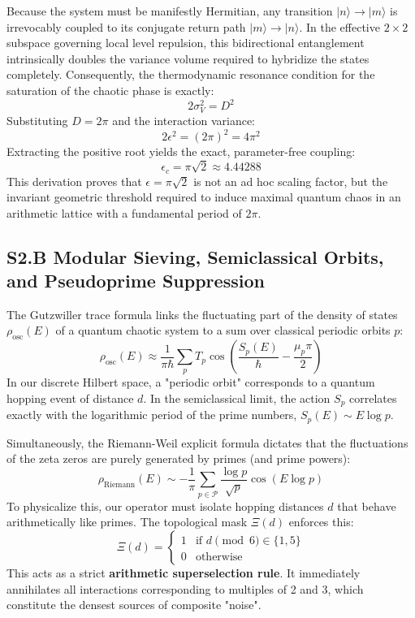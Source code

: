 \documentclass[aps,prl,preprint,superscriptaddress,floatfix]{revtex4-2}
\begin{document}
Because the system must be manifestly Hermitian, any transition $|n\rangle \to |m\rangle$ is irrevocably coupled to its conjugate return path $|m\rangle \to |n\rangle$. In the effective $2 \times 2$ subspace governing local level repulsion, this bidirectional entanglement intrinsically doubles the variance volume required to hybridize the states completely. Consequently, the thermodynamic resonance condition for the saturation of the chaotic phase is exactly:
\begin{equation}
2 \sigma_V^2 = D^2
\end{equation}
Substituting $D = 2\pi$ and the interaction variance:
\begin{equation}
2 \epsilon^2 = (2\pi)^2 = 4\pi^2
\end{equation}
Extracting the positive root yields the exact, parameter-free coupling:
\begin{equation}
\epsilon_c = \pi\sqrt{2} \approx 4.44288
\end{equation}
This derivation proves that $\epsilon = \pi\sqrt{2}$ is not an ad hoc scaling factor, but the invariant geometric threshold required to induce maximal quantum chaos in an arithmetic lattice with a fundamental period of $2\pi$.

\subsection{S2.B Modular Sieving, Semiclassical Orbits, and Pseudoprime Suppression}

The Gutzwiller trace formula links the fluctuating part of the density of states $\rho_{\text{osc}}(E)$ of a quantum chaotic system to a sum over classical periodic orbits $p$:
\begin{equation}
\rho_{\text{osc}}(E) \approx \frac{1}{\pi \hbar} \sum_p T_p \cos\left( \frac{S_p(E)}{\hbar} - \frac{\mu_p \pi}{2} \right)
\end{equation}
In our discrete Hilbert space, a "periodic orbit" corresponds to a quantum hopping event of distance $d$. In the semiclassical limit, the action $S_p$ correlates exactly with the logarithmic period of the prime numbers, $S_p(E) \sim E \log p$.

Simultaneously, the Riemann-Weil explicit formula dictates that the fluctuations of the zeta zeros are purely generated by primes (and prime powers):
\begin{equation}
\rho_{\text{Riemann}}(E) \sim -\frac{1}{\pi} \sum_{p \in \mathcal{P}} \frac{\log p}{\sqrt{p}} \cos(E \log p)
\end{equation}
To physicalize this, our operator must isolate hopping distances $d$ that behave arithmetically like primes. The topological mask $\Xi(d)$ enforces this:
\begin{equation}
\Xi(d) = \begin{cases} 1 & \text{if } d \pmod 6 \in \{1, 5\} \\ 0 & \text{otherwise} \end{cases}
\end{equation}
This acts as a strict \textbf{arithmetic superselection rule}. It immediately annihilates all interactions corresponding to multiples of 2 and 3, which constitute the densest sources of composite "noise". 
\end{document}
